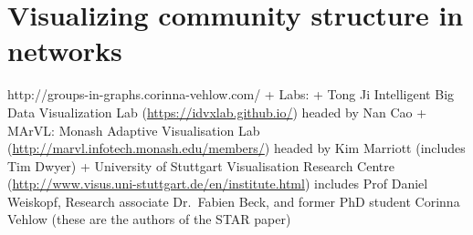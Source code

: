\section{Visualizing community structure in
networks}\label{visualizing-community-structure-in-networks}

http://groups-in-graphs.corinna-vehlow.com/ + Labs: + Tong Ji
Intelligent Big Data Visualization Lab
(\url{https://idvxlab.github.io/}) headed by Nan Cao + MArVL: Monash
Adaptive Visualisation Lab
(\url{http://marvl.infotech.monash.edu/members/}) headed by Kim Marriott
(includes Tim Dwyer) + University of Stuttgart Visualisation Research
Centre (\url{http://www.visus.uni-stuttgart.de/en/institute.html})
includes Prof Daniel Weiskopf, Research associate Dr.~Fabien Beck, and
former PhD student Corinna Vehlow (these are the authors of the STAR
paper)


